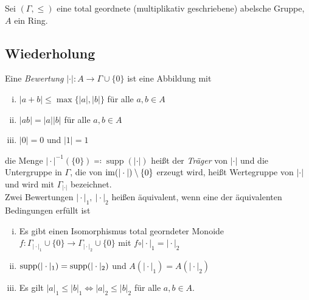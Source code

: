 Sei $(\Gamma,\le)$ eine total geordnete (multiplikativ geschriebene) abelsche Gruppe, $A$ ein Ring. 
\subsection*{Wiederholung}
Eine \textit{Bewertung} $\vert \cdot \vert:A\to \Gamma \cup \{0\}$ ist eine Abbildung mit 
\begin{enumerate}[(i)]
   \item $\vert a+b\vert \le \max\{ \vert a\vert, \vert b\vert \}$ für alle $a,b\in A$
    \item $\vert ab\vert = \vert a\vert \vert b \vert$ für alle $a,b\in A$
    \item $\vert 0 \vert =0$ und $\vert 1\vert =1$
\end{enumerate}
die Menge $\vert \cdot \vert^{-1}(\{0\})\eqqcolon \operatorname{supp}(\vert \cdot \vert)$ heißt der \textit{Träger} von $\vert \cdot \vert$ und die Untergruppe in $\Gamma$, die von $\operatorname{im} (\vert \cdot \vert) \setminus \{0\}$ erzeugt wird, heißt Wertegruppe von $\vert \cdot \vert$ und wird 
mit $\Gamma_{\vert\cdot \vert}$ bezeichnet. \\
Zwei Bewertungen $\vert \cdot \vert_1, \ \vert \cdot \vert_2$ heißen äquivalent, wenn eine der äquivalenten Bedingungen erfüllt ist 
\begin{enumerate}[(i)]
    \item Es gibt einen Isomorphismus total georndeter Monoide $f:\Gamma_{\vert \cdot \vert_1}\cup \{0\}\to \Gamma_{\vert \cdot\vert_2}\cup \{0\}$ mit $f\circ \vert \cdot\vert_1 = \vert \cdot \vert_2$
    \item $\operatorname{supp} (\vert\cdot\vert_1 )= \operatorname{supp}( \vert \cdot\vert_2)$ und $A(\vert\cdot\vert_1) = A(\vert \cdot\vert_2)$
    \item Es gilt $\vert a\vert_1 \le \vert b\vert_1 \Leftrightarrow \vert a\vert_2 \le \vert b\vert_2$ für alle $a,b\in A$.
\end{enumerate}
